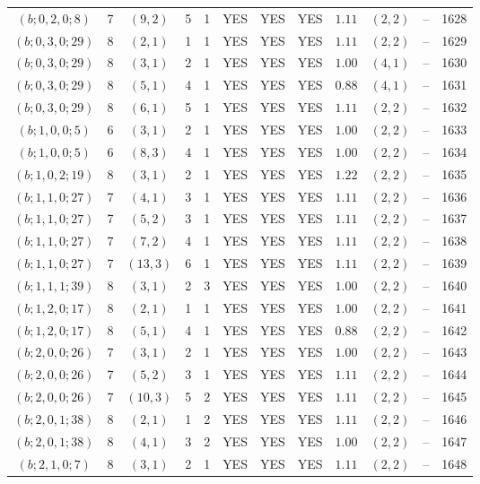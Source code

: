 \begin{longtable}{|c|c|c|c|c|c|c|c|c|c|c|c|}
$(b;0,2,0;8)$ & 7 & $(9,2)$ & 5 & 1 & YES & YES & YES & $1.11$ & $(2,2)$ & -- & 1628\\
$(b;0,3,0;29)$ & 8 & $(2,1)$ & 1 & 1 & YES & YES & YES & $1.11$ & $(2,2)$ & -- & 1629\\
$(b;0,3,0;29)$ & 8 & $(3,1)$ & 2 & 1 & YES & YES & YES & $1.00$ & $(4,1)$ & -- & 1630\\
$(b;0,3,0;29)$ & 8 & $(5,1)$ & 4 & 1 & YES & YES & YES & $0.88$ & $(4,1)$ & -- & 1631\\
$(b;0,3,0;29)$ & 8 & $(6,1)$ & 5 & 1 & YES & YES & YES & $1.11$ & $(2,2)$ & -- & 1632\\
$(b;1,0,0;5)$ & 6 & $(3,1)$ & 2 & 1 & YES & YES & YES & $1.00$ & $(2,2)$ & -- & 1633\\
$(b;1,0,0;5)$ & 6 & $(8,3)$ & 4 & 1 & YES & YES & YES & $1.00$ & $(2,2)$ & -- & 1634\\
$(b;1,0,2;19)$ & 8 & $(3,1)$ & 2 & 1 & YES & YES & YES & $1.22$ & $(2,2)$ & -- & 1635\\
$(b;1,1,0;27)$ & 7 & $(4,1)$ & 3 & 1 & YES & YES & YES & $1.11$ & $(2,2)$ & -- & 1636\\
$(b;1,1,0;27)$ & 7 & $(5,2)$ & 3 & 1 & YES & YES & YES & $1.11$ & $(2,2)$ & -- & 1637\\
$(b;1,1,0;27)$ & 7 & $(7,2)$ & 4 & 1 & YES & YES & YES & $1.11$ & $(2,2)$ & -- & 1638\\
$(b;1,1,0;27)$ & 7 & $(13,3)$ & 6 & 1 & YES & YES & YES & $1.11$ & $(2,2)$ & -- & 1639\\
$(b;1,1,1;39)$ & 8 & $(3,1)$ & 2 & 3 & YES & YES & YES & $1.00$ & $(2,2)$ & -- & 1640\\
$(b;1,2,0;17)$ & 8 & $(2,1)$ & 1 & 1 & YES & YES & YES & $1.00$ & $(2,2)$ & -- & 1641\\
$(b;1,2,0;17)$ & 8 & $(5,1)$ & 4 & 1 & YES & YES & YES & $0.88$ & $(2,2)$ & -- & 1642\\
$(b;2,0,0;26)$ & 7 & $(3,1)$ & 2 & 1 & YES & YES & YES & $1.00$ & $(2,2)$ & -- & 1643\\
$(b;2,0,0;26)$ & 7 & $(5,2)$ & 3 & 1 & YES & YES & YES & $1.11$ & $(2,2)$ & -- & 1644\\
$(b;2,0,0;26)$ & 7 & $(10,3)$ & 5 & 2 & YES & YES & YES & $1.11$ & $(2,2)$ & -- & 1645\\
$(b;2,0,1;38)$ & 8 & $(2,1)$ & 1 & 2 & YES & YES & YES & $1.11$ & $(2,2)$ & -- & 1646\\
$(b;2,0,1;38)$ & 8 & $(4,1)$ & 3 & 2 & YES & YES & YES & $1.00$ & $(2,2)$ & -- & 1647\\
$(b;2,1,0;7)$ & 8 & $(3,1)$ & 2 & 1 & YES & YES & YES & $1.11$ & $(2,2)$ & -- & 1648\\

\end{longtable}
